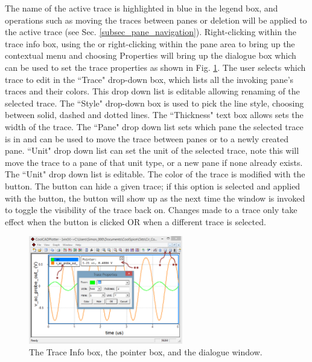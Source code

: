 The name of the active trace is highlighted in blue in the legend box, and operations such as moving the traces between panes or deletion will be applied to the active trace (see Sec. \ref{subsec_pane_navigation}).  Right-clicking within the trace info box, using the  or right-clicking within the pane area to bring up the contextual menu and choosing \textsf{Properties} will bring up the dialogue box which can be used to set the trace properties as shown in Fig. \ref{fig_plotter_legendpointerboxes_traceprops}. The user selects which trace to edit in the ``\textsf{Trace}" drop-down box, which lists all the invoking pane's traces and their colors. This drop down list is editable allowing renaming of the selected trace. The ``\textsf{Style}" drop-down box is used to pick the line style, choosing between solid, dashed and dotted lines. The ``\textsf{Thickness}" text box allows sets the width of the trace. The ``\textsf{Pane}" drop down list sets which pane the selected trace is in and can be used to move the trace between panes or to a newly created pane. ``\textsf{Unit}" drop down list can set the unit of the selected trace, note this will move the trace to a pane of that unit type, or a new pane if none already exists. The ``\textsf{Unit}" drop down list is editable. The color of the trace is modified with the  button.  The  button can hide a given trace; if this option is selected and applied with the  button, the button will show up as  the next time the  window is invoked to toggle the visibility of the trace back on. Changes made to a trace only take effect when the  button is clicked OR when a different trace is selected.

\begin{figure}
    \includegraphics[width=0.6\textwidth]{./figures/plotter_netlist_editor_figures/Plotter_Legend_Pointer_Properties_Boxes.png}
    \caption{{The Trace Info box, the pointer box, and the  dialogue window.}}
  \label{fig_plotter_legendpointerboxes_traceprops}
\end{figure}


